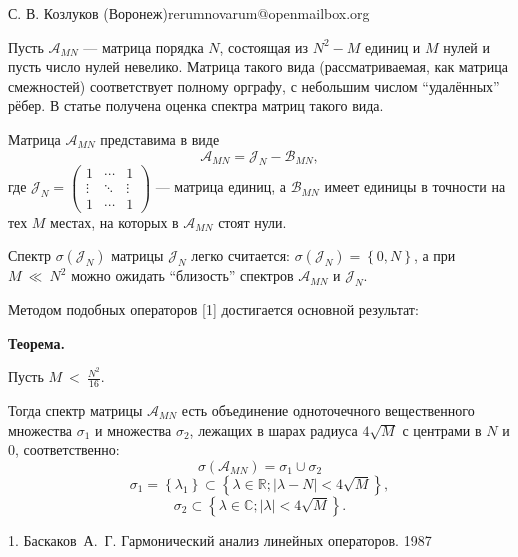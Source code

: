 \documentclass[a4paper]{article}
\begin{document}
{С. В. Козлуков}
{}{ (Воронеж)}{rerumnovarum@openmailbox.org}

Пусть \( \mathcal{A}_{MN} \) --- матрица порядка \( N \),
состоящая из \( N^2 - M \) единиц и \( M \) нулей
и пусть число нулей невелико.
Матрица такого вида (рассматриваемая, как матрица смежностей) соответствует
полному орграфу, с небольшим числом ``удалённых'' рёбер.
В статье получена оценка спектра
матриц такого вида.

Матрица \( \mathcal{A}_{MN} \) представима в виде
\[
    \mathcal{A}_{MN} = \mathcal{J}_{N} - \mathcal{B}_{MN},
    \]
где \(
\mathcal{J}_{N} =
\begin{pmatrix}1 & \cdots & 1 \\
\vdots & \ddots & \vdots \\
1 & \cdots & 1
\end{pmatrix} \) --- матрица единиц,
а \( \mathcal{B}_{MN} \) имеет единицы в точности на тех \( M \)
местах, на которых в \( \mathcal{A}_{MN} \) стоят нули.

Спектр \( \sigma(\mathcal{J}_{N}) \) матрицы \( \mathcal{J}_{N} \) легко считается:
\( \sigma\left({\mathcal{J}_{N}}\right) = \left\{0, N \right\} \),
а при \( M~\ll~N^2 \) можно ожидать ``близость'' спектров
\( \mathcal{A}_{MN} \) и \( \mathcal{J}_{N} \).

Методом подобных операторов [1]
достигается основной результат:

\textbf{Теорема.}
\begin{center}\relax
    Пусть
    \(M~<~\displaystyle{\frac{N^2}{16}}. \)

Тогда спектр матрицы \( \mathcal{A}_{MN} \) есть объединение
    одноточечного вещественного множества \( \sigma_1 \)
    и множества \( \sigma_2 \),
    лежащих в шарах
    радиуса \( 4\sqrt{M} \)
    с центрами в \( N \) и \( 0 \), соответственно:
    \[ \sigma\left(\mathcal{A}_{MN}\right) = \sigma_1 \cup \sigma_2 \]
    \[ \sigma_1 = \left\{\lambda_1 \right\}
        \subset \left\{\lambda\in\mathbb{R}; \lvert \lambda - N \rvert < 4\sqrt{M} \right\}, \]
    \[ \sigma_2
        \subset \left\{ \lambda\in\mathbb{C}; \lvert \lambda \rvert < 4\sqrt{M} \right\}. \]
\end{center}

\liter

1. Баскаков~А.~Г. Гармонический анализ линейных операторов. 1987
\end{document}
